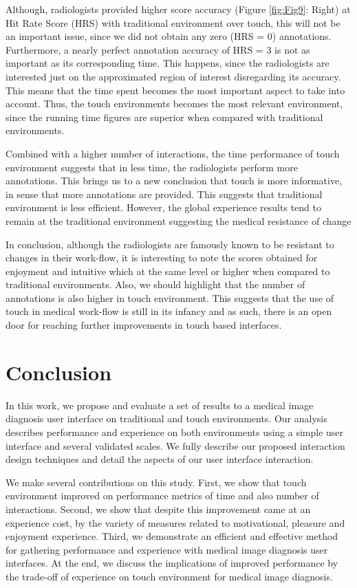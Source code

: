 \documentclass{sigchi}
\begin{document}
Although, radiologists provided higher score accuracy (Figure \ref{fig:Fig9}: Right) at Hit Rate Score (HRS) with traditional environment over touch, this will not be an important issue, since we did not obtain any zero (HRS = 0) annotations. Furthermore, a nearly perfect annotation accuracy of HRS = 3 is not as important as its corresponding time. This happens, since the radiologists are interested just on the approximated region of interest disregarding its accuracy. This means that the time spent becomes the most important aspect to take into account. Thus, the touch environments becomes the most relevant environment, since the running time figures are superior when compared with traditional environments.

Combined with a higher number of interactions, the time performance of touch environment suggests that in less time, the radiologists perform more annotations. This brings us to a new conclusion that touch is more informative, in sense that more annotations are provided. This suggests that traditional environment is less efficient. However, the global experience results tend to remain at the traditional environment suggesting the medical resistance of change

In conclusion, although the radiologists are famously known to be resistant to changes in their work-flow, it is interesting to note the scores obtained
for enjoyment and intuitive which at the same level or higher when compared to traditional environments. Also, we should highlight that the number of annotations is also higher in touch environment. This suggests that the use of touch in medical work-flow is still in its infancy and as such, there is an open door for reaching further improvements in touch based interfaces. 

\section{Conclusion}

In this work, we propose and evaluate a set of results to a medical image diagnosis user interface on traditional and touch environments. Our analysis describes performance and experience on both environments using a simple user interface and several validated scales. We fully describe our proposed interaction design techniques and detail the aspects of our user interface interaction.

We make several contributions on this study. First, we show that touch environment improved on performance metrics of time and also number of interactions. Second, we show that despite this improvement came at an experience cost, by the variety of measures related to motivational, pleasure and enjoyment experience. Third, we demonstrate an efficient and effective method for gathering performance and experience with medical image diagnosis user interfaces. At the end, we discuss the implications of improved performance by the trade-off of experience on touch environment for medical image diagnosis.
\end{document}
